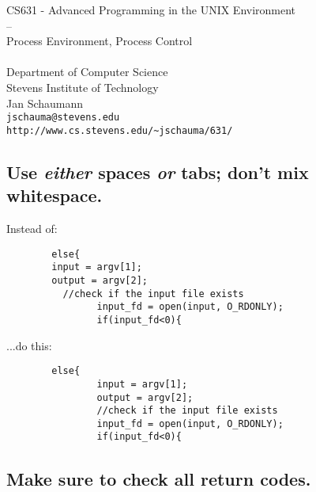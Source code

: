 \documentclass[xga]{xdvislides}
\begin{document}
\setfontphv

\lhead{\slidetitle}
\cfoot{\relax}
\rfoot{\Gray{\today}}

\newcommand{\smallish}{\fontsize{16}{16}\selectfont}

\vspace*{\fill}
\begin{center}
	\Hugesize
		CS631 - Advanced Programming in the UNIX Environment\\
		-- \\
		Process Environment, Process Control \\
	\hspace*{5mm}\blueline\\ [1em]
	\Normalsize
		Department of Computer Science\\
		Stevens Institute of Technology\\
		Jan Schaumann\\
		\verb+jschauma@stevens.edu+\\
		\verb+http://www.cs.stevens.edu/~jschauma/631/+
\end{center}
\vspace*{\fill}

\subsection{Use {\em either} spaces {\em or} tabs; don't mix whitespace.}

Instead of:
\begin{verbatim}
        else{
        input = argv[1];
        output = argv[2];
          //check if the input file exists
                input_fd = open(input, O_RDONLY);
                if(input_fd<0){
\end{verbatim}

...do this:
\begin{verbatim}
        else{
                input = argv[1];
                output = argv[2];
                //check if the input file exists
                input_fd = open(input, O_RDONLY);
                if(input_fd<0){
\end{verbatim}


\subsection{Make sure to check all return codes.}
\end{document}
